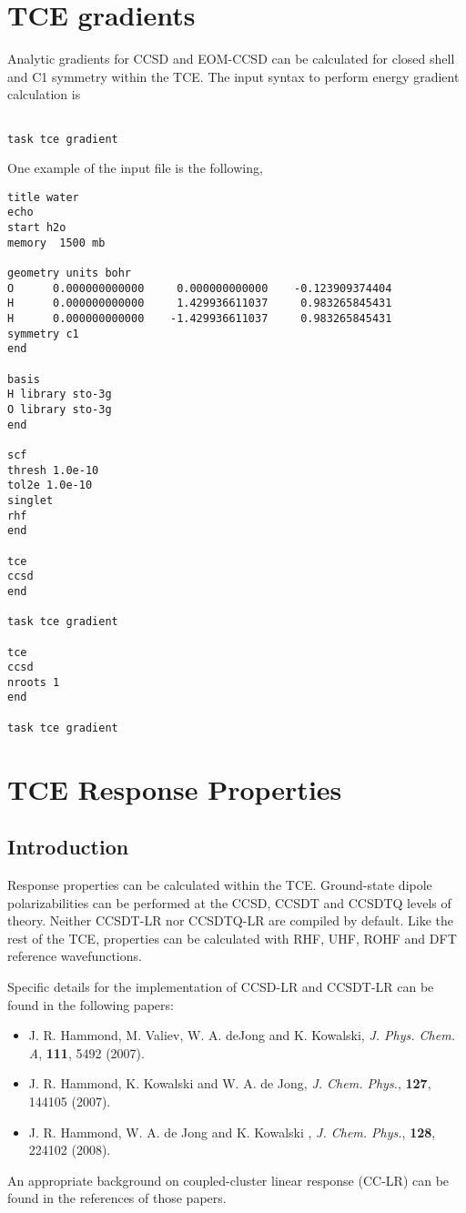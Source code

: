 \section{TCE gradients}

Analytic gradients for CCSD and EOM-CCSD can be calculated for closed shell and C1 symmetry within
the TCE. The input syntax to perform energy gradient calculation is

\begin{verbatim}

task tce gradient

\end{verbatim}

One example of the input file is the following,

\begin{verbatim}
title water
echo
start h2o
memory  1500 mb

geometry units bohr
O      0.000000000000     0.000000000000    -0.123909374404
H      0.000000000000     1.429936611037     0.983265845431
H      0.000000000000    -1.429936611037     0.983265845431
symmetry c1
end

basis
H library sto-3g
O library sto-3g
end

scf
thresh 1.0e-10
tol2e 1.0e-10
singlet
rhf
end

tce
ccsd
end

task tce gradient

tce
ccsd
nroots 1
end

task tce gradient

\end{verbatim}

\section{TCE Response Properties}

\subsection{Introduction}

Response properties can be calculated within the TCE.  Ground-state dipole polarizabilities can be performed at the CCSD, CCSDT and CCSDTQ levels of theory.  Neither CCSDT-LR nor CCSDTQ-LR are compiled by default.  Like the rest of the TCE, properties can be calculated with RHF, UHF, ROHF and DFT reference wavefunctions.

Specific details for the implementation of CCSD-LR and CCSDT-LR can be found in the following papers:
\begin{itemize}
\item J. R. Hammond, M. Valiev, W. A. deJong and K. Kowalski, \textit{J. Phys. Chem. A}, \textbf{111}, 5492 (2007).
\item J. R. Hammond, K. Kowalski and W. A. de Jong, \textit{J. Chem. Phys.}, \textbf{127}, 144105 (2007).
\item J. R. Hammond, W. A. de Jong and K. Kowalski , \textit{J. Chem. Phys.}, \textbf{128}, 224102 (2008).
\end{itemize}
An appropriate background on coupled-cluster linear response (CC-LR) can be found in the references of those papers.

